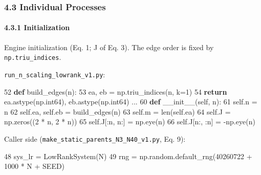 \documentclass[
  a4paper,
]{ltjsarticle}
\newenvironment{Shaded}{}{}
\newcommand{\BuiltInTok}[1]{\textcolor[rgb]{0.00,0.50,0.00}{#1}}
\newcommand{\ControlFlowTok}[1]{\textcolor[rgb]{0.00,0.44,0.13}{\textbf{#1}}}
\newcommand{\DecValTok}[1]{\textcolor[rgb]{0.25,0.63,0.44}{#1}}
\newcommand{\FunctionTok}[1]{\textcolor[rgb]{0.02,0.16,0.49}{#1}}
\newcommand{\KeywordTok}[1]{\textcolor[rgb]{0.00,0.44,0.13}{\textbf{#1}}}
\newcommand{\NormalTok}[1]{#1}
\newcommand{\OperatorTok}[1]{\textcolor[rgb]{0.40,0.40,0.40}{#1}}
\newcommand{\VariableTok}[1]{\textcolor[rgb]{0.10,0.09,0.49}{#1}}
\begin{document}
\subsubsection{4.3 Individual Processes}\label{individual-processes}

\paragraph{4.3.1 Initialization}\label{initialization}

Engine initialization (Eq. 1; J of Eq. 3). The edge order is fixed by
\texttt{np.triu\_indices}.

\texttt{run\_n\_scaling\_lowrank\_v1.py}:

\begin{Shaded}
\begin{Highlighting}[]
    \DecValTok{52}  \KeywordTok{def}\NormalTok{ build\_edges(n):}
    \DecValTok{53}\NormalTok{      ea, eb }\OperatorTok{=}\NormalTok{ np.triu\_indices(n, k}\OperatorTok{=}\DecValTok{1}\NormalTok{)}
    \DecValTok{54}      \ControlFlowTok{return}\NormalTok{ ea.astype(np.int64), eb.astype(np.int64)}
\NormalTok{...}
    \DecValTok{60}      \KeywordTok{def} \FunctionTok{\_\_init\_\_}\NormalTok{(}\VariableTok{self}\NormalTok{, n):}
    \DecValTok{61}          \VariableTok{self}\NormalTok{.n }\OperatorTok{=}\NormalTok{ n}
    \DecValTok{62}          \VariableTok{self}\NormalTok{.ea, }\VariableTok{self}\NormalTok{.eb }\OperatorTok{=}\NormalTok{ build\_edges(n)}
    \DecValTok{63}          \VariableTok{self}\NormalTok{.m }\OperatorTok{=} \BuiltInTok{len}\NormalTok{(}\VariableTok{self}\NormalTok{.ea)}
    \DecValTok{64}          \VariableTok{self}\NormalTok{.J }\OperatorTok{=}\NormalTok{ np.zeros((}\DecValTok{2} \OperatorTok{*}\NormalTok{ n, }\DecValTok{2} \OperatorTok{*}\NormalTok{ n))}
    \DecValTok{65}          \VariableTok{self}\NormalTok{.J[:n, n:] }\OperatorTok{=}\NormalTok{ np.eye(n)}
    \DecValTok{66}          \VariableTok{self}\NormalTok{.J[n:, :n] }\OperatorTok{=} \OperatorTok{{-}}\NormalTok{np.eye(n)}
\end{Highlighting}
\end{Shaded}

Caller side (\texttt{make\_static\_parents\_N3\_N40\_v1.py}, Eq. 9):

\begin{Shaded}
\begin{Highlighting}[]
    \DecValTok{48}\NormalTok{          sys\_lr }\OperatorTok{=}\NormalTok{ LowRankSystem(N)}
    \DecValTok{49}\NormalTok{          rng }\OperatorTok{=}\NormalTok{ np.random.default\_rng(}\DecValTok{40260722} \OperatorTok{+} \DecValTok{1000} \OperatorTok{*}\NormalTok{ N }\OperatorTok{+}\NormalTok{ SEED)}
\end{Highlighting}
\end{Shaded}
\end{document}
